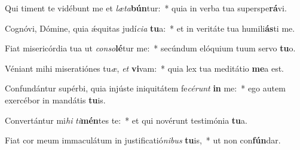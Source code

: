 \item Qui timent te vidébunt me et \textit{læ}\textit{ta}\textbf{bún}tur:~* quia in verba tua superspe\textbf{rá}vi.
\item Cognóvi, Dómine, quia ǽquitas judí\textit{ci}\textit{a} \textbf{tu}a:~* et in veritáte tua humili\textbf{ás}ti me.
\item Fiat misericórdia tua ut \textit{con}\textit{so}\textbf{lé}tur me:~* secúndum elóquium tuum servo \textbf{tu}o.
\item Véniant mihi miseratiónes tu\textit{æ}, \textit{et} \textbf{vi}vam:~* quia lex tua meditátio \textbf{me}a est.
\item Confundántur supérbi, quia injúste iniquitátem fe\textit{cé}\textit{runt} \textbf{in} me:~* ego autem exercébor in mandátis \textbf{tu}is.
\item Convertántur mi\textit{hi} \textit{ti}\textbf{mén}tes te:~* et qui novérunt testimónia \textbf{tu}a.
\item Fiat cor meum immaculátum in justificatió\textit{ni}\textit{bus} \textbf{tu}is,~* ut non con\textbf{fún}dar.
